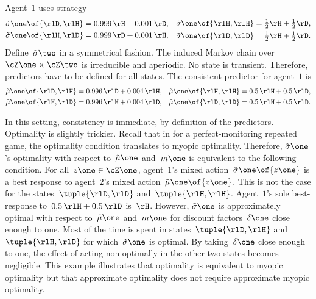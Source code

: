 Agent~\(1\) uses strategy
\[
\begin{aligned}
\tilde{\sigma}\one \of{\rlD, \rlH} & = 0.999 \, \rH + 0.001 \, \rD, \\
\tilde{\sigma}\one \of{\rlH, \rlD} & = 0.999 \, \rD + 0.001 \, \rH, \\
\end{aligned}
\quad
\begin{aligned}
\tilde{\sigma}\one \of{\rlH, \rlH} & = \tfrac{1}{2} \rH + \tfrac{1}{2} \rD, \\
\tilde{\sigma}\one \of{\rlD, \rlD} & = \tfrac{1}{2} \rH + \tfrac{1}{2} \rD. \\
\end{aligned}
\]
Define~\(\tilde{\sigma}\two\) in a symmetrical fashion.
The induced Markov chain over~\(\cZ\one \times \cZ\two\) is irreducible and aperiodic.
No state is transient.
Therefore, predictors have to be defined for all states.
The consistent predictor for agent~\(1\) is
\[
\begin{aligned}
\tilde{\mu}\one \of{\rlD, \rlH} & = 0.996 \, \rlD + 0.004 \, \rlH, \\
\tilde{\mu}\one \of{\rlH, \rlD} & = 0.996 \, \rlH + 0.004 \, \rlD, \\
\end{aligned}
\quad
\begin{aligned}
\tilde{\mu}\one \of{\rlH, \rlH} & = 0.5 \, \rlH + 0.5 \, \rlD, \\
\tilde{\mu}\one \of{\rlD, \rlD} & = 0.5 \, \rlH + 0.5 \, \rlD. \\
\end{aligned}
\]

In this setting, consistency is immediate, by definition of the predictors.
Optimality is slightly trickier.
Recall that in  for a perfect-monitoring repeated game, the optimality condition translates to myopic optimality.
Therefore, \(\tilde{\sigma}\one\)'s optimality with respect to~\(\tilde{\mu}\one\) and~\(m\one\) is equivalent to the following condition.
For all~\(z\one \in \cZ\one\), agent~\(1\)'s mixed action~\(\tilde{\sigma}\one \of{z\one}\) is a best response to agent~\(2\)'s mixed action~\(\tilde{\mu}\one \of{z\one}\).
This is not the case for the states~\(\tuple{\rlD, \rlD}\) and~\(\tuple{\rlH, \rlH}\).
Agent~\(1\)'s sole best-response to~\(0.5 \, \rlH + 0.5 \, \rlD\) is~\(\rH\).
However, \(\tilde{\sigma}\one\) is approximately optimal with respect to~\(\tilde{\mu}\one\) and~\(m\one\) for discount factors~\(\delta\one\) close enough to one.
Most of the time is spent in states~\(\tuple{\rlD, \rlH}\) and~\(\tuple{\rlH, \rlD}\) for which~\(\tilde{\sigma}\one\) is optimal.
By taking~\(\delta\one\) close enough to one, the effect of acting non-optimally in the other two states becomes negligible.
This example illustrates that optimality is equivalent to myopic optimality but that approximate optimality does not require approximate myopic optimality.

